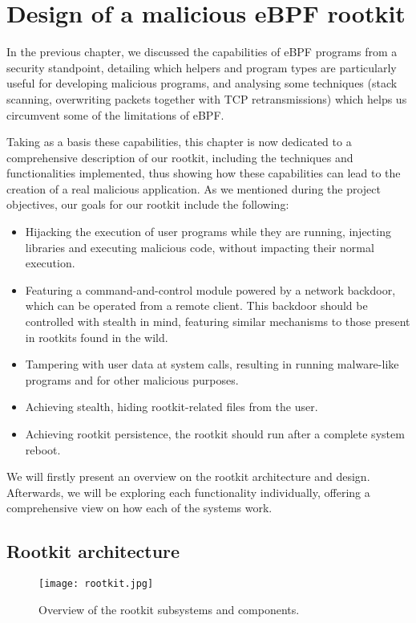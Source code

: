 \chapter{Design of a malicious eBPF rootkit}
In the previous chapter, we discussed the capabilities of eBPF programs from a security standpoint, detailing which helpers and program types are particularly useful for developing malicious programs, and analysing some techniques (stack scanning, overwriting packets together with TCP retransmissions) which helps us circumvent some of the limitations of eBPF.

Taking as a basis these capabilities, this chapter is now dedicated to a comprehensive description of our rootkit, including the techniques and functionalities implemented, thus showing how these capabilities can lead to the creation of a real malicious application. As we mentioned during the project objectives, our goals for our rootkit include the following:
\begin{itemize}
\item Hijacking the execution of user programs while they are running, injecting libraries and executing malicious code, without impacting their normal execution.
\item Featuring a command-and-control module powered by a network backdoor, which can be operated from a remote client. This backdoor should be controlled with stealth in mind, featuring similar mechanisms to those present in rootkits found in the wild.
\item Tampering with user data at system calls, resulting in running malware-like programs and for other malicious purposes.
\item Achieving stealth, hiding rootkit-related files from the user.
\item Achieving rootkit persistence, the rootkit should run after a complete system reboot.
\end{itemize}

We will firstly present an overview on the rootkit architecture and design. Afterwards, we will be exploring each functionality individually, offering a comprehensive view on how each of the systems work.

\section{Rootkit architecture}
\begin{figure}[htbp]
	\centering
	\texttt{[image: rootkit.jpg]}
	\caption{Overview of the rootkit subsystems and components.}
	\label{fig:rootkit}
\end{figure}


